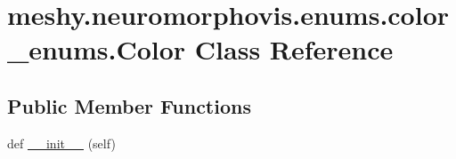 \hypertarget{classmeshy_1_1neuromorphovis_1_1enums_1_1color__enums_1_1Color}{}\section{meshy.\+neuromorphovis.\+enums.\+color\+\_\+enums.\+Color Class Reference}
\label{classmeshy_1_1neuromorphovis_1_1enums_1_1color__enums_1_1Color}


 


\subsection*{Public Member Functions}
\begin{DoxyCompactItemize}
\item 
def \hyperlink{classmeshy_1_1neuromorphovis_1_1enums_1_1color__enums_1_1Color_a6e8572af62ec8ece6efc8e0f1edb0867}{\+\_\+\+\_\+init\+\_\+\+\_\+} (self)\hypertarget{classmeshy_1_1neuromorphovis_1_1enums_1_1color__enums_1_1Color_a6e8572af62ec8ece6efc8e0f1edb0867}{}\label{classmeshy_1_1neuromorphovis_1_1enums_1_1color__enums_1_1Color_a6e8572af62ec8ece6efc8e0f1edb0867}

\end{DoxyCompactItemize}
